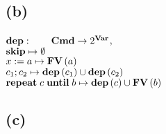 \documentclass[12pt,a4paper]{article}
\begin{document}
	\subsection*{(b)}
	
	\indent\indent $\text{\textbf{dep}}: \qquad \text{\textbf{Cmd}}\rightarrow 2^{\text{\textbf{Var}}}$,\\
	\indent $\text{\textbf{skip}}\mapsto\emptyset$\\
	\indent $x:=a\mapsto \text{\textbf{FV}}\left( a\right)$\\
	\indent $c_1;c_2\mapsto \text{\textbf{dep}}\left( c_1\right) \cup\text{\textbf{dep}}\left( c_2\right)$\\
	\indent $\text{\textbf{repeat}}\; c\; \text{\textbf{until}}\; b \mapsto \text{\textbf{dep}}\left( c\right) \cup \text{\textbf{FV}}\left( b\right)$

	\subsection*{(c)}
	
	
\end{document}
